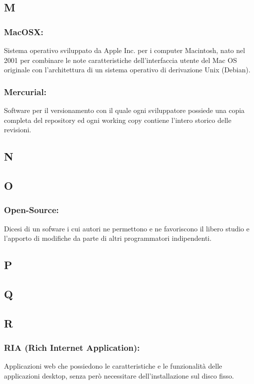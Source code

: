 \subsection*{\huge{M}}
\subsubsection*{MacOSX:} Sistema operativo sviluppato da Apple Inc. per i
computer Macintosh, nato nel 2001 per combinare le note caratteristiche
dell'interfaccia utente del Mac OS originale con l'architettura di un sistema
operativo di derivazione Unix (Debian).

\subsubsection*{Mercurial:} Software per il versionamento con il quale ogni
sviluppatore possiede una copia completa del repository ed ogni working copy
contiene l'intero storico delle revisioni.

\subsection*{\huge{N}}

\subsection*{\huge{O}}
\subsubsection*{Open-Source:} Dicesi di un sofware i cui autori ne permettono e
ne favoriscono il libero studio e l'apporto di modifiche da parte di altri programmatori indipendenti.
\subsection*{\huge{P}}
\subsection*{\huge{Q}}
\subsection*{\huge{R}}
\subsubsection*{RIA (Rich Internet Application):} Applicazioni web che
possiedono le caratteristiche e le funzionalit\`a delle applicazioni desktop, senza per\`o
necessitare dell'installazione sul disco fisso.

